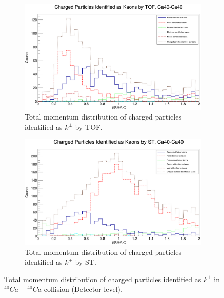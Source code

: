\documentclass[12pt, twocolumn]{article}
\begin{document}
\begin{figure}[h]
\centering
\begin{subfigure}[h]{0.49\textwidth}
\centering
\includegraphics[scale=0.14]{Detector_pToT_kaons(tof)_Ca.png}
\caption{Total momentum distribution of charged particles identified as $k^{\pm}$ by TOF.}
\label{Detector - Total momentum distribution of kaons (TOF) Ca40.}
\end{subfigure}
\hfill
\begin{subfigure}[h]{0.49\textwidth}
\centering
\includegraphics[scale=0.14]{Detector_pToT_kaons(st)_Ca.png}
\caption{Total momentum distribution of charged particles identified as $k^{\pm}$ by ST.}
\label{Detector - Total momentum distribution of kaons (ST) Ca40.}
\end{subfigure}
\caption{Total momentum distribution of charged particles identified as $k^{\pm}$ in $^{40}Ca-{^{40}Ca}$ collision (Detector level).}
\label{Total momentum distribution of charged particles identified as kaons in Ca40-Ca40 collision.}
\end{figure}
\end{document}
